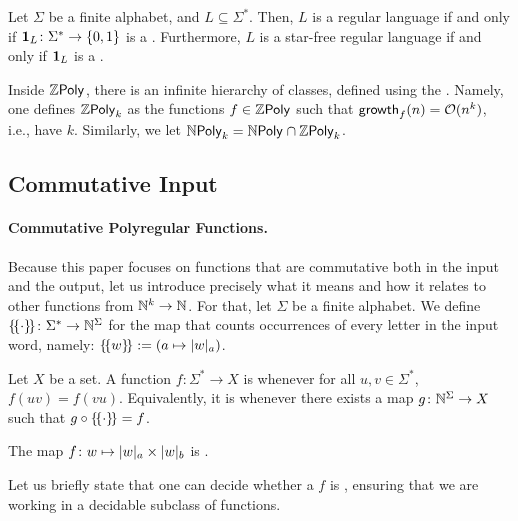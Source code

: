 \begin{example}
    \label{regular-language:ex}
    Let $\Sigma$ be a finite alphabet, and
    $L \subseteq \Sigma^*$. Then,
    $L$ is a regular language if and only if
    $\mathbf{1}_{L} \colon \Sigma^* \to \mathopen{\{} 0,1 \mathclose{\}}$ is a
    .
    Furthermore, $L$ is a star-free regular language
    if and only if $\mathbf{1}_{L}$ is a
    .
\end{example}

\AP Inside $\ZPoly$, there is an infinite hierarchy of classes, defined using
the . Namely, one defines $\ZPoly[k]$ as the functions $f \in
\ZPoly$ such that $\mathsf{growth}_{f}(n) = \mathcal{O}(n^k)$, i.e., have 
$k$. Similarly, we let $\NPoly[k] = \NPoly \cap \ZPoly[k]$.


\subsection{Commutative Input}

\paragraph{Commutative Polyregular Functions.}
\AP 
Because this paper focuses on functions that are commutative both in the
input and the output, let us introduce precisely what it means and how it
relates to other functions from $\mathbb{N}^k \to \mathbb{N}$. For that, let $\Sigma$ be a
finite alphabet. We define $\commute \colon \Sigma^* \to \Nat^\Sigma$ for the
map that counts occurrences of every letter in the input word, namely: $
\commute[w] \defined (a \mapsto \card[a]{w})$.

\AP Let $X$ be a set. A function $f \colon \Sigma^* \to X$ is
 whenever for all $u,v \in \Sigma^*$, $f(uv) = f(vu)$.
Equivalently, it is  whenever there exists a map $g \colon
\mathbb{N}^\Sigma \to X$ such that $g \circ \commute = f$.

\begin{example}
    \label{commutative-function:ex}
    The map $f \colon w \mapsto \card[a]{w} \times \card[b]{w}$ is .
\end{example}

Let us briefly state that one can decide whether a  $f$ is , ensuring that we are working in a decidable
subclass of functions. 

